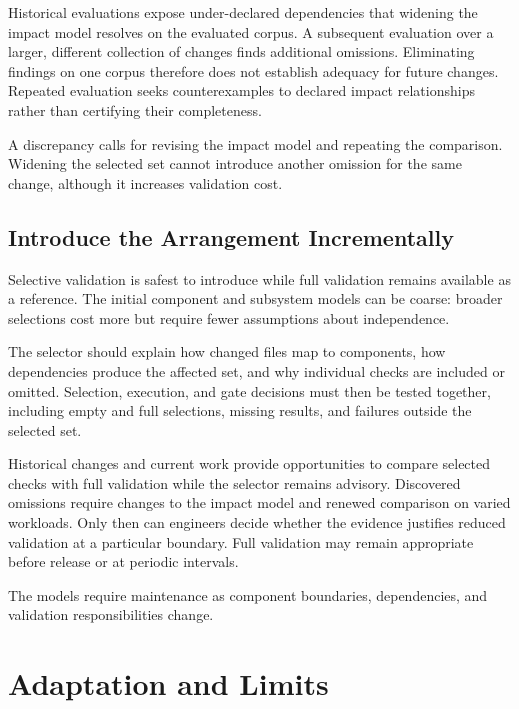 Historical evaluations expose under-declared dependencies that widening the impact model resolves on the evaluated corpus. A subsequent evaluation over a larger, different collection of changes finds additional omissions. Eliminating findings on one corpus therefore does not establish adequacy for future changes. Repeated evaluation seeks counterexamples to declared impact relationships rather than certifying their completeness.

A discrepancy calls for revising the impact model and repeating the comparison. Widening the selected set cannot introduce another omission for the same change, although it increases validation cost.

\subsection*{Introduce the Arrangement Incrementally}\label{heading:introduce-the-arrangement-incrementally}

Selective validation is safest to introduce while full validation remains available as a reference. The initial component and subsystem models can be coarse: broader selections cost more but require fewer assumptions about independence.

The selector should explain how changed files map to components, how dependencies produce the affected set, and why individual checks are included or omitted. Selection, execution, and gate decisions must then be tested together, including empty and full selections, missing results, and failures outside the selected set.

Historical changes and current work provide opportunities to compare selected checks with full validation while the selector remains advisory. Discovered omissions require changes to the impact model and renewed comparison on varied workloads. Only then can engineers decide whether the evidence justifies reduced validation at a particular boundary. Full validation may remain appropriate before release or at periodic intervals.

The models require maintenance as component boundaries, dependencies, and validation responsibilities change.

\section{Adaptation and Limits}\label{heading:adaptation-and-limits}


